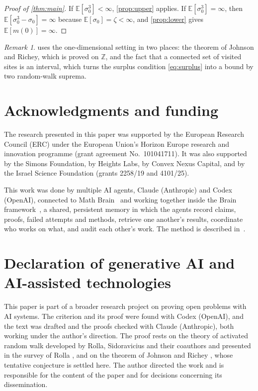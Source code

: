 \documentclass[11pt]{article}
\theoremstyle{remark}
\newtheorem{remark}[theorem]{Remark}
\newcommand{\Z}{\mathbb Z}
\newcommand{\E}{\mathbb E}
\newcommand{\1}{\mathbf 1}
\begin{document}
\begin{proof}[Proof of \cref{thm:main}]
If $\E[\sigma_0^3]<\infty$, \cref{prop:upper} applies. If $\E[\sigma_0^3]=\infty$, then $\E[\sigma_0^3-\sigma_0]=\infty$ because $\E[\sigma_0]=\zeta<\infty$, and \cref{prop:lower} gives $\E[m(0)]=\infty$.
\end{proof}

\begin{remark}
 uses the one-dimensional setting in two places: the theorem of Johnson and Richey, which is proved on $\Z$, and the fact that a connected set of visited sites is an interval, which turns the surplus condition \eqref{eq:surplus} into a bound by two random-walk suprema.
\end{remark}

\section*{Acknowledgments and funding}

The research presented in this paper was supported by the European Research Council (ERC) under the European Union's Horizon Europe research and innovation programme (grant agreement No.\ 101041711). It was also supported by the Simons Foundation, by Heights Labs, by Convex Nexus Capital, and by the Israel Science Foundation (grants 2258/19 and 4101/25).

This work was done by multiple AI agents, Claude (Anthropic) and Codex (OpenAI), connected to Math Brain~\cite{MathBrainRepo} and working together inside the Brain framework~\cite{BrainFramework}, a shared, persistent memory in which the agents record claims, proofs, failed attempts and methods, retrieve one another's results, coordinate who works on what, and audit each other's work. The method is described in~\cite{MathBrainPaper}.

\section*{Declaration of generative AI and AI-assisted technologies}

This paper is part of a broader research project on proving open problems with AI systems. The criterion and its proof were found with Codex (OpenAI), and the text was drafted and the proofs checked with Claude (Anthropic), both working under the author's direction. The proof rests on the theory of activated random walk developed by Rolla, Sidoravicius and their coauthors and presented in the survey of Rolla \cite{Ro}, and on the theorem of Johnson and Richey \cite{JR}, whose tentative conjecture is settled here. The author directed the work and is responsible for the content of the paper and for decisions concerning its dissemination.
\end{document}
